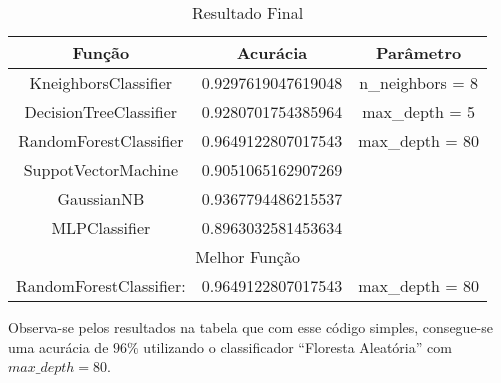 \setlength{\arrayrulewidth}{0.6mm}
\begin{table}[h!]
\centering
\begin{tabular}{ |c|c|c| }
 \hline
 Função                   & Acurácia           & Parâmetro  \\
 \hline
 KneighborsClassifier     & 0.9297619047619048 & n\_neighbors = 8  \\
 DecisionTreeClassifier   & 0.9280701754385964 & max\_depth = 5    \\
 RandomForestClassifier   & 0.9649122807017543 & max\_depth = 80   \\
 SuppotVectorMachine      & 0.9051065162907269 &                   \\
 GaussianNB               & 0.9367794486215537 &                   \\
 MLPClassifier            & 0.8963032581453634 &                   \\
 \hline
 \hline
 \multicolumn{3}{|c|}{ Melhor Função} \\
 \hline
 RandomForestClassifier:  & 0.9649122807017543 & max\_depth = 80   \\
 \hline
\end{tabular}
  \caption{Resultado Final}
\label{tab:resultado}
\end{table}

Observa-se pelos resultados na tabela que com esse código simples, consegue-se uma acurácia de $96\%$
utilizando o classificador ``Floresta Aleatória'' com $max\_depth=80$.








